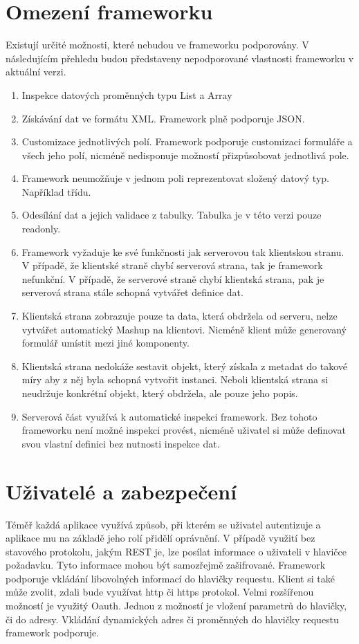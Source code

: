 \section{Omezení frameworku}
Existují určité možnosti, které nebudou ve frameworku podporovány. V následujícím přehledu budou představeny nepodporované vlastnosti frameworku v aktuální verzi.
\begin{enumerate}
\item Inspekce datových proměnných typu List a Array
\item Získávání dat ve formátu XML. Framework plně podporuje JSON.
\item Customizace jednotlivých polí. Framework podporuje customizaci formuláře a všech jeho polí, nicméně nedisponuje možností přizpůsobovat jednotlivá pole.
\item Framework neumožňuje v jednom poli reprezentovat složený datový typ. Například třídu.
\item Odesílání dat a jejich validace z tabulky. Tabulka je v této verzi pouze readonly.
\item Framework vyžaduje ke své funkčnosti jak serverovou tak klientskou stranu. V případě, že klientské straně chybí serverová strana, tak je framework nefunkční. V případě, že serverové straně chybí klientská strana, pak je serverová strana stále schopná vytvářet definice dat.
\item Klientská strana zobrazuje pouze ta data, která obdržela od serveru, nelze vytvářet automatický Mashup na klientovi. Nicméně klient může generovaný formulář umístit mezi jiné komponenty.
\item Klientská strana nedokáže sestavit objekt, který získala z metadat do takové míry aby z něj byla schopná vytvořit instanci. Neboli klientská strana si neudržuje konkrétní objekt, který obdržela, ale pouze jeho popis.
\item Serverová část využívá k automatické inspekci framework. Bez tohoto frameworku není možné inspekci provést, nicméně uživatel si může definovat svou vlastní definici bez nutnosti inspekce dat.
\end{enumerate}

\section{Uživatelé a zabezpečení}
Téměř každá aplikace využívá způsob, při kterém se uživatel autentizuje a aplikace mu na základě jeho rolí přidělí oprávnění. V případě využití bez stavového protokolu, jakým REST je, lze posílat informace o uživateli v hlavičce požadavku. Tyto informace mohou být samozřejmě zašifrované. Framework podporuje vkládání libovolných informací do hlavičky requestu. Klient si také může zvolit, zdali bude využívat http či https protokol. Velmi rozšířenou možností je využitý Oauth. Jednou z možností je vložení parametrů do hlavičky, či do adresy. Vkládání dynamických adres či proměnných do hlavičky requestu framework podporuje. 

